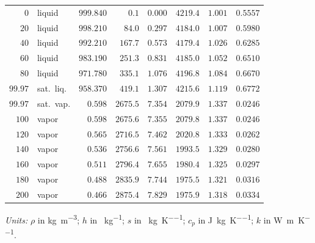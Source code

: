 \begin{twocol}[0.46]
{\begin{tabularx}{\linewidth}{@{}r X r r r r r r@{}}
$0$ & liquid & $999.840$ & $0.1$ & $0.000$ & $4219.4$ & $1.001$ & $0.5557$\\
$20$ & liquid & $998.210$ & $84.0$ & $0.297$ & $4184.0$ & $1.007$ & $0.5980$\\
$40$ & liquid & $992.210$ & $167.7$ & $0.573$ & $4179.4$ & $1.026$ & $0.6285$\\
$60$ & liquid & $983.190$ & $251.3$ & $0.831$ & $4185.0$ & $1.052$ & $0.6510$\\
$80$ & liquid & $971.780$ & $335.1$ & $1.076$ & $4196.8$ & $1.084$ & $0.6670$\\
$99.97$ & sat.\ liq. & $958.370$ & $419.1$ & $1.307$ & $4215.6$ & $1.119$ & $0.6772$\\
$99.97$ & sat.\ vap. & $0.598$ & $2675.5$ & $7.354$ & $2079.9$ & $1.337$ & $0.0246$\\
$100$ & vapor & $0.598$ & $2675.6$ & $7.355$ & $2079.8$ & $1.337$ & $0.0246$\\
$120$ & vapor & $0.565$ & $2716.5$ & $7.462$ & $2020.8$ & $1.333$ & $0.0262$\\
$140$ & vapor & $0.536$ & $2756.6$ & $7.561$ & $1993.5$ & $1.329$ & $0.0280$\\
$160$ & vapor & $0.511$ & $2796.4$ & $7.655$ & $1980.4$ & $1.325$ & $0.0297$\\
$180$ & vapor & $0.488$ & $2835.9$ & $7.744$ & $1975.5$ & $1.321$ & $0.0316$\\
$200$ & vapor & $0.466$ & $2875.4$ & $7.829$ & $1975.9$ & $1.318$ & $0.0334$\\
\bottomrule
\end{tabularx}}
{\scriptsize\noindent\emph{Units:} $\rho$ in \si{\kilogram\per\cubic\meter}; $h$ in \si{\kilojoule\per\kilogram}; $s$ in \si{\kilojoule\per\kilogram\per\kelvin}; $c_p$ in \si{\joule\per\kilogram\per\kelvin}; $k$ in \si{\watt\per\meter\per\kelvin}.}
\end{twocol}
\clearpage

